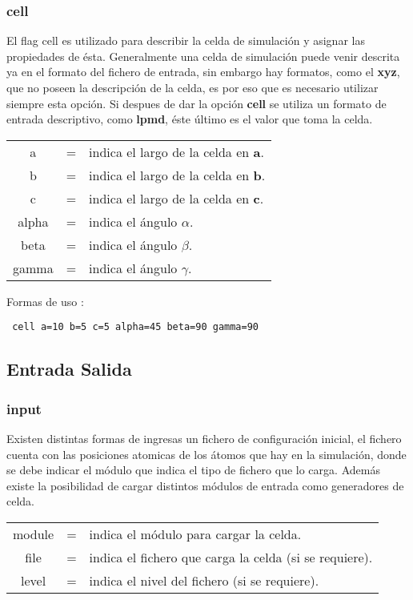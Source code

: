 \documentclass[a4paper,10pt]{scrbook}
\begin{document}
\subsubsection{cell}

El flag cell es utilizado para describir la celda de simulaci\'on y asignar las propiedades de \'esta. Generalmente una celda de simulaci\'on puede venir descrita ya en el formato del fichero de entrada, sin embargo hay formatos, como el \textbf{xyz}, que no poseen la descripci\'on de la celda, es por eso que es necesario utilizar siempre esta opci\'on. Si despues de dar la opci\'on \textbf{cell} se utiliza un formato de entrada descriptivo, como \textbf{lpmd}, \'este \'ultimo es el valor que toma la celda.

\begin{tabular}{ccl}
 a & = & indica el largo de la celda en \textbf{a}.\\
 b & = & indica el largo de la celda en \textbf{b}.\\
 c & = & indica el largo de la celda en \textbf{c}.\\
 alpha & = & indica el \'angulo $\alpha$.\\
 beta & = & indica el \'angulo $\beta$.\\
 gamma & = & indica el \'angulo $\gamma$.\\
\end{tabular}

Formas de uso :

\begin{verbatim}
 cell a=10 b=5 c=5 alpha=45 beta=90 gamma=90
\end{verbatim}

\subsection{Entrada Salida}

\subsubsection{input}
Existen distintas formas de ingresas un fichero de configuraci\'on inicial, el fichero cuenta con las posiciones atomicas de los \'atomos que hay en la simulaci\'on, donde se debe indicar el m\'odulo que indica el tipo de fichero que lo carga. Adem\'as existe la posibilidad de cargar distintos m\'odulos de entrada como generadores de celda.

\begin{tabular}{ccl}
 module & = & indica el m\'odulo para cargar la celda.\\
 file & = & indica el fichero que carga la celda (si se requiere).\\
 level & = & indica el nivel del fichero (si se requiere).\\
\end{tabular}
\end{document}
